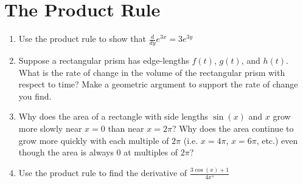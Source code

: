 \documentclass[12pt]{report}
\begin{document}
\newcommand{\less}{\textless}
\newcommand{\greater}{\textgreater}
\newcommand{\reals}{\mathbb{R}}
\newcommand{\integers}{\mathbb{Z}}
\newcommand{\rationals}{\mathbb{Q}}
\newcommand{\dsp}{\displaystyle}


\section*{The Product Rule}

\begin{enumerate}

\item Use the product rule to show that $\frac{d}{dy}e^{3x}=3e^{3y}$

\item Suppose a rectangular prism has edge-lengths $f(t)$, $g(t)$, and $h(t)$. What is the rate of change in the volume of the rectangular prism with respect to time? Make a geometric argument to support the rate of change you find. 

\item Why does the area of a rectangle with side lengths $\sin(x)$ and $x$ grow more slowly near $x=0$ than near $x=2\pi$? Why does the area continue to grow more quickly with each multiple of $2\pi$ (i.e. $x=4\pi$, $x=6\pi$, etc.) even though the area is always $0$ at multiples of $2\pi$?

\item Use the product rule to find the derivative of $\frac{3\cos(x)+1}{4x^5}$

\end{enumerate}
\end{document}
